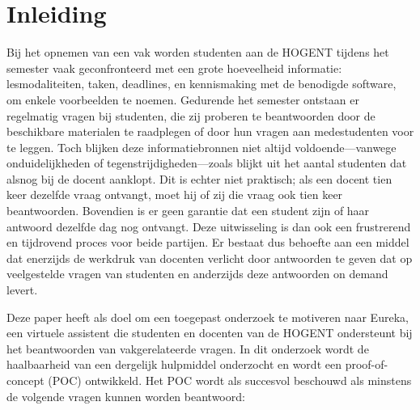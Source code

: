 


% 

\section{Inleiding}%
\label{sec:inleiding}

Bij het opnemen van een vak worden studenten aan de HOGENT tijdens het semester vaak geconfronteerd met een grote hoeveelheid informatie: lesmodaliteiten, taken, deadlines, en kennismaking met de benodigde software, om enkele voorbeelden te noemen. Gedurende het semester ontstaan er regelmatig vragen bij studenten, die zij proberen te beantwoorden door de beschikbare materialen te raadplegen of door hun vragen aan medestudenten voor te leggen. Toch blijken deze informatiebronnen niet altijd voldoende---vanwege onduidelijkheden of tegenstrijdigheden---zoals blijkt uit het aantal studenten dat alsnog bij de docent aanklopt. Dit is echter niet praktisch; als een docent tien keer dezelfde vraag ontvangt, moet hij of zij die vraag ook tien keer beantwoorden. Bovendien is er geen garantie dat een student zijn of haar antwoord dezelfde dag nog ontvangt. Deze uitwisseling is dan ook een frustrerend en tijdrovend proces voor beide partijen. Er bestaat dus behoefte aan een middel dat enerzijds de werkdruk van docenten verlicht door antwoorden te geven dat op veelgestelde vragen van studenten en anderzijds deze antwoorden on demand levert. 

Deze paper heeft als doel om een toegepast onderzoek te motiveren naar Eureka, een virtuele assistent die studenten en docenten van de HOGENT ondersteunt bij het beantwoorden van vakgerelateerde vragen. In dit onderzoek wordt de haalbaarheid van een dergelijk hulpmiddel onderzocht en wordt een proof-of-concept (POC) ontwikkeld. Het POC wordt als succesvol beschouwd als minstens de volgende vragen kunnen worden beantwoord: 

